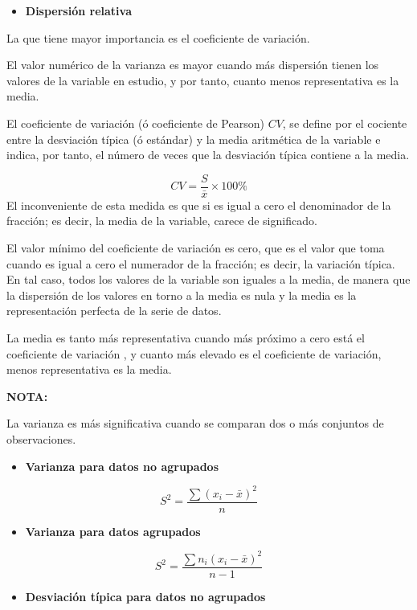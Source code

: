 \documentclass[
]{book}
\providecommand{\tightlist}{%
  \setlength{\itemsep}{0pt}\setlength{\parskip}{0pt}}
\theoremstyle{definition}
\theoremstyle{definition}
\theoremstyle{definition}
\theoremstyle{definition}
\theoremstyle{remark}
\begin{document}
\begin{itemize}
\tightlist
\item
  \textbf{Dispersión relativa}
\end{itemize}

La que tiene mayor importancia es el coeficiente de variación.

El valor numérico de la varianza es mayor cuando más dispersión tienen los valores de la
variable en estudio, y por tanto, cuanto menos representativa es la media.

El coeficiente de variación (ó coeficiente de Pearson) \(CV\), se define por el cociente
entre la desviación típica (ó estándar) y la media aritmética de la variable e indica,
por tanto, el número de veces que la desviación típica contiene a la media.

\[
CV=\dfrac{S}{\bar{x}}\times 100 \%
\]
El inconveniente de esta medida es que si es igual a cero el denominador de la fracción;
es decir, la media de la variable, carece de significado.

El valor mínimo del coeficiente de variación es cero, que es el valor que toma cuando es
igual a cero el numerador de la fracción; es decir, la variación típica. En tal caso,
todos los valores de la variable son iguales a la media, de manera que la dispersión de
los valores en torno a la media es nula y la media es la representación perfecta de la
serie de datos.

La media es tanto más representativa cuando más próximo a cero está el coeficiente de
variación , y cuanto más elevado es el coeficiente de variación, menos representativa es
la media.

\textbf{NOTA:}

La varianza es más significativa cuando se comparan dos o más conjuntos de
observaciones.

\begin{itemize}
\tightlist
\item
  \textbf{Varianza para datos no agrupados}
\end{itemize}

\[
S^{2}=\dfrac{\sum ( x_{i}-\bar{x})^{2}}{n}
\]

\begin{itemize}
\tightlist
\item
  \textbf{Varianza para datos agrupados}
\end{itemize}

\[
S^{2}=\dfrac{\sum n_{i}( x_{i}-\bar{x})^{2}}{n-1}
\]

\begin{itemize}
\tightlist
\item
  \textbf{Desviación típica para datos no agrupados}
\end{itemize}
\end{document}
